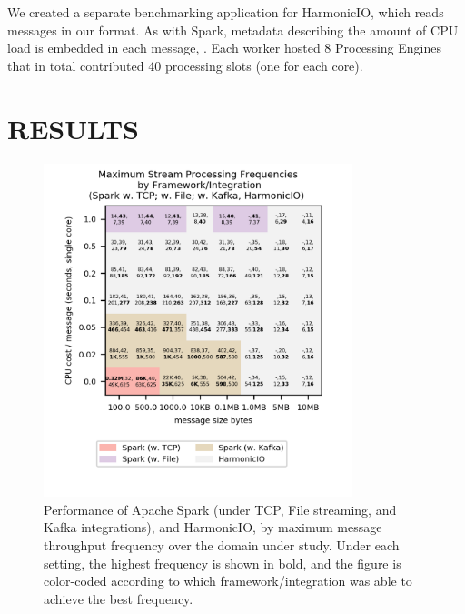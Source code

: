 \documentclass[conference]{IEEEtran}
\begin{document}
We created a separate benchmarking application for HarmonicIO, which reads messages in our format. As with Spark, metadata describing the amount of CPU load is embedded in each message, . Each worker hosted 8 Processing Engines that in total contributed 40 processing slots (one for each core). %






\section{RESULTS}\label{results}

\begin{figure}[h]
\begin{center}
\includegraphics[width=9cm]{images/best-w-freqs.png}
\end{center}

\caption{Performance of Apache Spark (under TCP, File streaming, and Kafka integrations), and HarmonicIO, by maximum message throughput frequency over the domain under study. Under each setting, the highest frequency is shown in bold, and the figure is color-coded according to which framework/integration was able to achieve the best frequency.}
\label{fig:blobs}
\end{figure}
\end{document}
